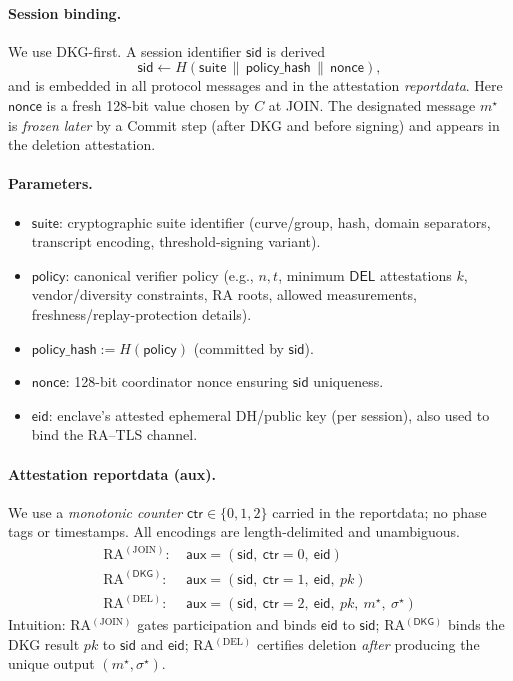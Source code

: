 \documentclass[runningheads,orivec]{llncs}
\begin{document}
\paragraph{Session binding.}
We use DKG-first. A session identifier $\mathsf{sid}$ is derived
\[
  \mathsf{sid} \gets H(\mathsf{suite}\,\|\,\mathsf{policy\_hash}\,\|\,\mathsf{nonce}),
\]
and is embedded in all protocol messages and in the attestation \emph{reportdata}.
Here $\mathsf{nonce}$ is a fresh 128-bit value chosen by $C$ at JOIN.
The designated message $m^{\star}$ is \emph{frozen later} by a Commit step
(after DKG and before signing) and appears in the deletion attestation.

\paragraph{Parameters.}
\begin{itemize}[leftmargin=*,itemsep=0.25em]
  \item $\mathsf{suite}$: cryptographic suite identifier (curve/group, hash, domain separators, transcript encoding, threshold-signing variant).
  \item $\mathsf{policy}$: canonical verifier policy (e.g., $n,t$, minimum $\mathsf{DEL}$ attestations $k$, vendor/diversity constraints, RA roots, allowed measurements, freshness/replay-protection details).
  \item $\mathsf{policy\_hash} := H(\mathsf{policy})$ (committed by $\mathsf{sid}$).
  \item $\mathsf{nonce}$: 128-bit coordinator nonce ensuring $\mathsf{sid}$ uniqueness.
  \item $\mathsf{eid}$: enclave’s attested ephemeral DH/public key (per session), also used to bind the RA–TLS channel.
\end{itemize}

\paragraph{Attestation reportdata (aux).}
We use a \emph{monotonic counter} $\mathsf{ctr}\in\{0,1,2\}$ carried in the reportdata; no phase tags or timestamps.
All encodings are length-delimited and unambiguous.
\begin{align*}
  \text{RA}^{(\mathrm{JOIN})}\!:\ & \mathsf{aux} = (\mathsf{sid},\ \mathsf{ctr}{=}0,\ \mathsf{eid}) \\
  \text{RA}^{(\mathsf{DKG})}\!:\ & \mathsf{aux} = (\mathsf{sid},\ \mathsf{ctr}{=}1,\ \mathsf{eid},\ pk) \\
  \text{RA}^{(\mathrm{DEL})}\!:\ & \mathsf{aux} = (\mathsf{sid},\ \mathsf{ctr}{=}2,\ \mathsf{eid},\ pk,\ m^{\star},\ \sigma^{\star})
\end{align*}
Intuition: RA$^{(\mathrm{JOIN})}$ gates participation and binds $\mathsf{eid}$ to $\mathsf{sid}$; RA$^{(\mathsf{DKG})}$ binds the DKG result $pk$ to $\mathsf{sid}$ and $\mathsf{eid}$;
RA$^{(\mathrm{DEL})}$ certifies deletion \emph{after} producing the unique output $(m^{\star},\sigma^{\star})$.
\end{document}
